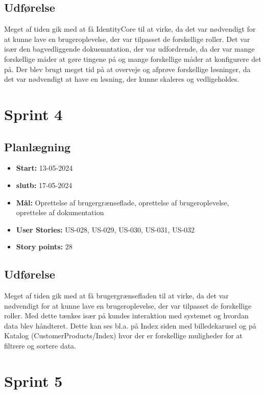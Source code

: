 \subsection{Udførelse}
\label{subsec:sprint-3-udforelse}
Meget af tiden gik med at få IdentityCore til at virke, da det var nødvendigt for at kunne lave en brugeroplevelse, der var tilpasset de forskellige roller.
Det var især den bagvedliggende dokuemntation, der var udfordrende, da der var mange forskellige måder at gøre tingene på og mange forskellige måder at konfigurere det på.
Der blev brugt meget tid på at overveje og afprøve forskellige løsninger, da det var nødvendigt at have en løsning, der kunne skaleres og vedligeholdes.

\section{Sprint 4}
\label{sec:sprint-4}
\subsection{Planlægning}
\label{subsec:sprint-4-plan}

\begin{itemize}
    \item \textbf{Start:} 13-05-2024
    \item \textbf{slutb:} 17-05-2024
    \item \textbf{Mål:} Oprettelse af brugergrænseflade, oprettelse af brugeroplevelse, oprettelse af dokumentation
    \item \textbf{User Stories:} US-028, US-029, US-030, US-031, US-032
    \item \textbf{Story points:} 28
\end{itemize}

\subsection{Udførelse}
\label{subsec:sprint-4-udforelse}
Meget af tiden gik med at få brugergrænsefladen til at virke, da det var nødvendigt for at kunne lave en brugeroplevelse, der var tilpasset de forskellige roller.
Med dette tænkes især på kundes interaktion med systemet og hvordan data blev håndteret. Dette kan ses bl.a. på Index siden med billedekarusel og på Katalog (CustomerProducts/Index) hvor der er forskellige muligheder for at filtrere og sortere data.

\section{Sprint 5}
\label{sec:sprint-5}
